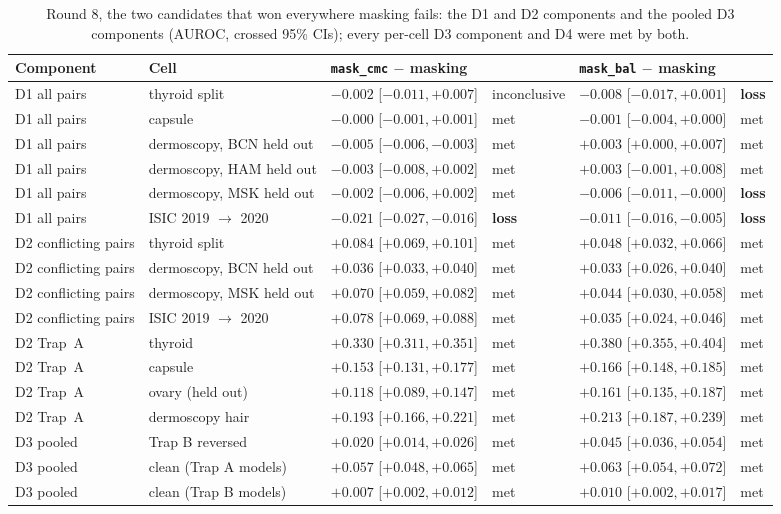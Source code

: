 \begin{table}[H]\centering\scriptsize
\caption{Round 8, the two candidates that won everywhere masking fails: the D1 and D2 components and the pooled D3 components (AUROC, crossed 95\% CIs); every per-cell D3 component and D4 were met by both.}\label{tab:rEightc}
\begin{tabular}{p{2.3cm}p{3.3cm}p{2.9cm}p{1.4cm}p{2.9cm}p{1.4cm}}\toprule
Component & Cell & \texttt{mask\_cmc} $-$ masking &  & \texttt{mask\_bal} $-$ masking &  \\\midrule
D1 all pairs & thyroid split & $-0.002$ [$-0.011, +0.007$] & inconclusive & $-0.008$ [$-0.017, +0.001$] & \textbf{loss} \\
D1 all pairs & capsule & $-0.000$ [$-0.001, +0.001$] & met & $-0.001$ [$-0.004, +0.000$] & met \\
D1 all pairs & dermoscopy, BCN held out & $-0.005$ [$-0.006, -0.003$] & met & $+0.003$ [$+0.000, +0.007$] & met \\
D1 all pairs & dermoscopy, HAM held out & $-0.003$ [$-0.008, +0.002$] & met & $+0.003$ [$-0.001, +0.008$] & met \\
D1 all pairs & dermoscopy, MSK held out & $-0.002$ [$-0.006, +0.002$] & met & $-0.006$ [$-0.011, -0.000$] & \textbf{loss} \\
D1 all pairs & ISIC 2019 $\to$ 2020 & $-0.021$ [$-0.027, -0.016$] & \textbf{loss} & $-0.011$ [$-0.016, -0.005$] & \textbf{loss} \\
D2 conflicting pairs & thyroid split & $+0.084$ [$+0.069, +0.101$] & met & $+0.048$ [$+0.032, +0.066$] & met \\
D2 conflicting pairs & dermoscopy, BCN held out & $+0.036$ [$+0.033, +0.040$] & met & $+0.033$ [$+0.026, +0.040$] & met \\
D2 conflicting pairs & dermoscopy, MSK held out & $+0.070$ [$+0.059, +0.082$] & met & $+0.044$ [$+0.030, +0.058$] & met \\
D2 conflicting pairs & ISIC 2019 $\to$ 2020 & $+0.078$ [$+0.069, +0.088$] & met & $+0.035$ [$+0.024, +0.046$] & met \\
D2 Trap~A & thyroid & $+0.330$ [$+0.311, +0.351$] & met & $+0.380$ [$+0.355, +0.404$] & met \\
D2 Trap~A & capsule & $+0.153$ [$+0.131, +0.177$] & met & $+0.166$ [$+0.148, +0.185$] & met \\
D2 Trap~A & ovary (held out) & $+0.118$ [$+0.089, +0.147$] & met & $+0.161$ [$+0.135, +0.187$] & met \\
D2 Trap~A & dermoscopy hair & $+0.193$ [$+0.166, +0.221$] & met & $+0.213$ [$+0.187, +0.239$] & met \\
D3 pooled & Trap B reversed & $+0.020$ [$+0.014, +0.026$] & met & $+0.045$ [$+0.036, +0.054$] & met \\
D3 pooled & clean (Trap A models) & $+0.057$ [$+0.048, +0.065$] & met & $+0.063$ [$+0.054, +0.072$] & met \\
D3 pooled & clean (Trap B models) & $+0.007$ [$+0.002, +0.012$] & met & $+0.010$ [$+0.002, +0.017$] & met \\
\bottomrule\end{tabular}
\end{table}
